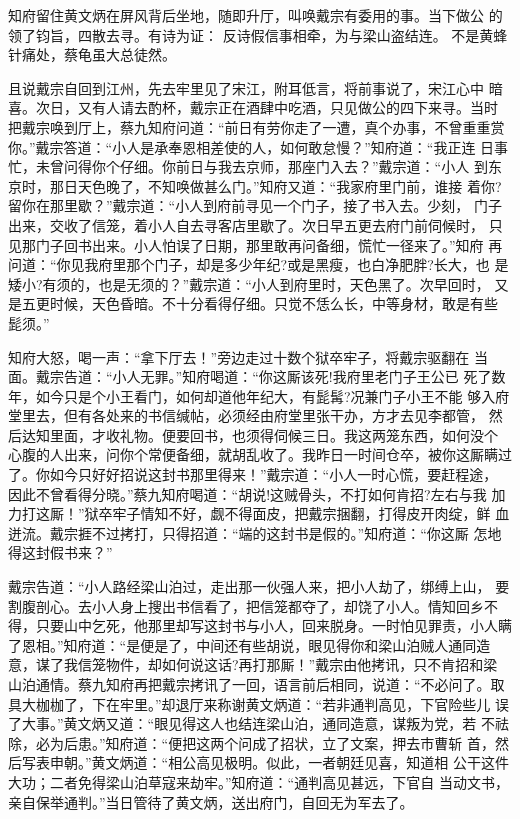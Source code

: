 知府留住黄文炳在屏风背后坐地，随即升厅，叫唤戴宗有委用的事。当下做公
的领了钧旨，四散去寻。有诗为证：
反诗假信事相牵，为与梁山盗结连。
不是黄蜂针痛处，蔡龟虽大总徒然。

且说戴宗自回到江州，先去牢里见了宋江，附耳低言，将前事说了，宋江心中
暗喜。次日，又有人请去酌杯，戴宗正在酒肆中吃酒，只见做公的四下来寻。当时
把戴宗唤到厅上，蔡九知府问道：“前日有劳你走了一遭，真个办事，不曾重重赏
你。”戴宗答道：“小人是承奉恩相差使的人，如何敢怠慢？”知府道：“我正连
日事忙，未曾问得你个仔细。你前日与我去京师，那座门入去？”戴宗道：“小人
到东京时，那日天色晚了，不知唤做甚么门。”知府又道：“我家府里门前，谁接
着你?留你在那里歇？”戴宗道：“小人到府前寻见一个门子，接了书入去。少刻，
门子出来，交收了信笼，着小人自去寻客店里歇了。次日早五更去府门前伺候时，
只见那门子回书出来。小人怕误了日期，那里敢再问备细，慌忙一径来了。”知府
再问道：“你见我府里那个门子，却是多少年纪?或是黑瘦，也白净肥胖?长大，也
是矮小?有须的，也是无须的？”戴宗道：“小人到府里时，天色黑了。次早回时，
又是五更时候，天色昏暗。不十分看得仔细。只觉不恁么长，中等身材，敢是有些
髭须。”

知府大怒，喝一声：“拿下厅去！”旁边走过十数个狱卒牢子，将戴宗驱翻在
当面。戴宗告道：“小人无罪。”知府喝道：“你这厮该死!我府里老门子王公已
死了数年，如今只是个小王看门，如何却道他年纪大，有髭髯?况兼门子小王不能
够入府堂里去，但有各处来的书信缄帖，必须经由府堂里张干办，方才去见李都管，
然后达知里面，才收礼物。便要回书，也须得伺候三日。我这两笼东西，如何没个
心腹的人出来，问你个常便备细，就胡乱收了。我昨日一时间仓卒，被你这厮瞒过
了。你如今只好好招说这封书那里得来！”戴宗道：“小人一时心慌，要赶程途，
因此不曾看得分晓。”蔡九知府喝道：“胡说!这贼骨头，不打如何肯招?左右与我
加力打这厮！”狱卒牢子情知不好，觑不得面皮，把戴宗捆翻，打得皮开肉绽，鲜
血迸流。戴宗捱不过拷打，只得招道：“端的这封书是假的。”知府道：“你这厮
怎地得这封假书来？”

戴宗告道：“小人路经梁山泊过，走出那一伙强人来，把小人劫了，绑缚上山，
要割腹剖心。去小人身上搜出书信看了，把信笼都夺了，却饶了小人。情知回乡不
得，只要山中乞死，他那里却写这封书与小人，回来脱身。一时怕见罪责，小人瞒
了恩相。”知府道：“是便是了，中间还有些胡说，眼见得你和梁山泊贼人通同造
意，谋了我信笼物件，却如何说这话?再打那厮！”戴宗由他拷讯，只不肯招和梁
山泊通情。蔡九知府再把戴宗拷讯了一回，语言前后相同，说道：“不必问了。取
具大枷枷了，下在牢里。”却退厅来称谢黄文炳道：“若非通判高见，下官险些儿
误了大事。”黄文炳又道：“眼见得这人也结连梁山泊，通同造意，谋叛为党，若
不祛除，必为后患。”知府道：“便把这两个问成了招状，立了文案，押去市曹斩
首，然后写表申朝。”黄文炳道：“相公高见极明。似此，一者朝廷见喜，知道相
公干这件大功；二者免得梁山泊草寇来劫牢。”知府道：“通判高见甚远，下官自
当动文书，亲自保举通判。”当日管待了黄文炳，送出府门，自回无为军去了。

